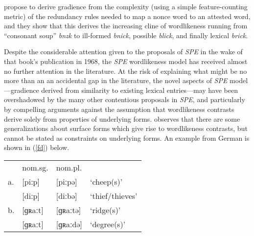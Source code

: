 \citet{Silverman2000}
\citet{Kiparsky1995}
\citet[352f.]{Hale2003a}
\citeauthor{SPE} propose to derive gradience from the complexity (using a simple feature-counting metric) of the redundancy rules needed to map a nonce word to an attested word, and they show that this derives the increasing cline of wordlikeness running from ``consonant soup'' \emph{bnzk} to ill-formed \emph{bnick}, possible \emph{blick}, and finally lexical \emph{brick}.

Despite the considerable attention given to the proposals of \emph{SPE} in the wake of that book's publication in 1968, the \emph{SPE} wordlikeness model has received almost no further attention in the literature. At the risk of explaining what might be no more than an an accidental gap in the literature, the novel aspects of \emph{SPE} model---gradience derived from similarity to existing lexical entries---may have been overshadowed by the many other contentious proposals in \emph{SPE}, and particularly by compelling arguments against the assumption that wordlikeness contrasts derive solely from properties of underlying forms. \citet{Shibatani1973} observes that there are some generalizations about surface forms which give rise to wordlikeness contrasts, but cannot be stated as constraints on underlying forms. An example from German is shown in (\ref{fd}) below.

\begin{example} 
\label{fd}
\begin{tabular}{l l l l}
   & nom.sg. & nom.pl.    \\
a. & [piːp]    & [piːpə]  & `cheep(s)'      \\
   & [diːp]    & [diːbə]  & `thief/thieves' \\
b. & [ɡʀaːt]   & [ɡʀaːtə] & `ridge(s)'      \\
   & [ɡʀaːt]   & [ɡʀaːdə] & `degree(s)'     \\
\end{tabular}
\end{example}

